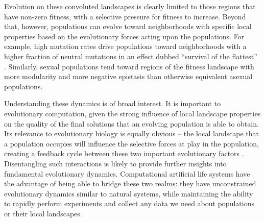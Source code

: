 \documentclass[10pt,letterpaper]{article}
\begin{document}
Evolution on these convoluted landscapes is clearly limited to those regions that have non-zero fitness, with a selective pressure for fitness to increase. Beyond that, however, populations can evolve toward neighborhoods with specific local properties based on the evolutionary forces acting upon the populations.  For example, high mutation rates drive populations toward neighborhoods with a higher fraction of neutral mutations in an effect dubbed “survival of the flattest” \cite{wilke_evolution_2001}. Similarly, sexual populations tend toward regions of the fitness landscape with more modularity \cite{misevic_sexual_2006} and more negative epistasis \cite{misevic_experiments_2010} than otherwise equivalent asexual populations.

Understanding these dynamics is of broad interest.  It is important to evolutionary computation, given the strong influence of local landscape properties on the quality of the final solutions that an evolving population is able to obtain. Its relevance to evolutionary biology is equally obvious -- the local landscape that a population occupies will influence the selective forces at play in the population, creating a feedback cycle between these two important evolutionary factors \cite{zaman_coevolution_2014,meyer_repeatability_2012}. Disentangling such interactions is likely to provide further insights into fundamental evolutionary dynamics.  Computational artificial life systems have the advantage of being able to bridge these two realms: they have unconstrained evolutionary dynamics similar to natural systems, while maintaining the ability to rapidly perform experiments and collect any data we need about populations or their local landscapes.
%
%
%
%
%
%
\end{document}
